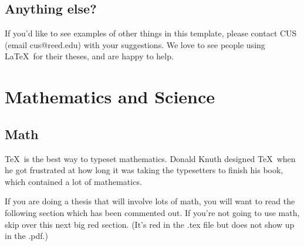 \documentclass[12pt,twoside]{reedthesis}
\begin{document}
\section{Anything else?}
If you'd like to see examples of other things in this template, please contact CUS (email cus@reed.edu) with your suggestions. We love to see people using \LaTeX\ for their theses, and are happy to help.


\chapter{Mathematics and Science}
\section{Math}
\TeX\ is the best way to typeset mathematics. Donald Knuth designed \TeX\ when he got frustrated at how long it was taking the typesetters to finish his book, which contained a lot of mathematics.

If you are doing a thesis that will involve lots of math, you will want to read the following section which has been commented out. If you're not going to use math, skip over this next big red section. (It's red in the .tex file but does not show up in the .pdf.)
%




%



%
\end{document}
